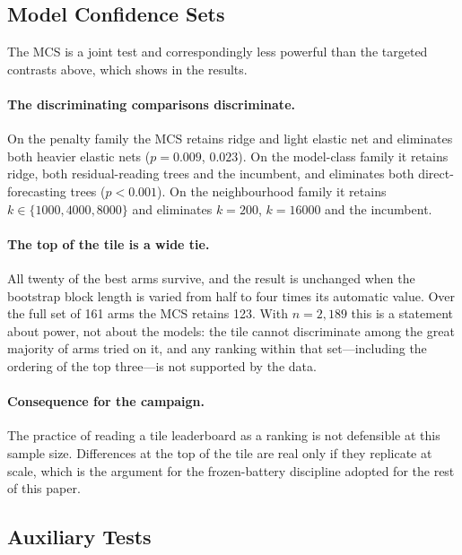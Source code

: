 \subsection{Model Confidence Sets}
\label{sec:mcs_results}



The MCS is a joint test and correspondingly less powerful than the targeted
contrasts above, which shows in the results.

\paragraph{The discriminating comparisons discriminate.} On the penalty family
the MCS retains ridge and light elastic net and eliminates both heavier
elastic nets ($p = 0.009$, $0.023$). On the model-class family it retains
ridge, both residual-reading trees and the incumbent, and eliminates both
direct-forecasting trees ($p < 0.001$). On the neighbourhood family it retains
$k \in \{1000, 4000, 8000\}$ and eliminates $k = 200$, $k = 16000$ and the
incumbent.

\paragraph{The top of the tile is a wide tie.} All twenty of the best arms
survive, and the result is unchanged when the bootstrap block length is varied
from half to four times its automatic value. Over the full set of 161 arms the
MCS retains 123. With $n = 2{,}189$ this is a statement about power, not about
the models: the tile cannot discriminate among the great majority of arms
tried on it, and any ranking within that set---including the ordering of the
top three---is not supported by the data.

\paragraph{Consequence for the campaign.} The practice of reading a tile
leaderboard as a ranking is not defensible at this sample size. Differences at
the top of the tile are real only if they replicate at scale, which is the
argument for the frozen-battery discipline adopted for the rest of this paper.

\subsection{Auxiliary Tests}
\label{sec:aux_tests}

